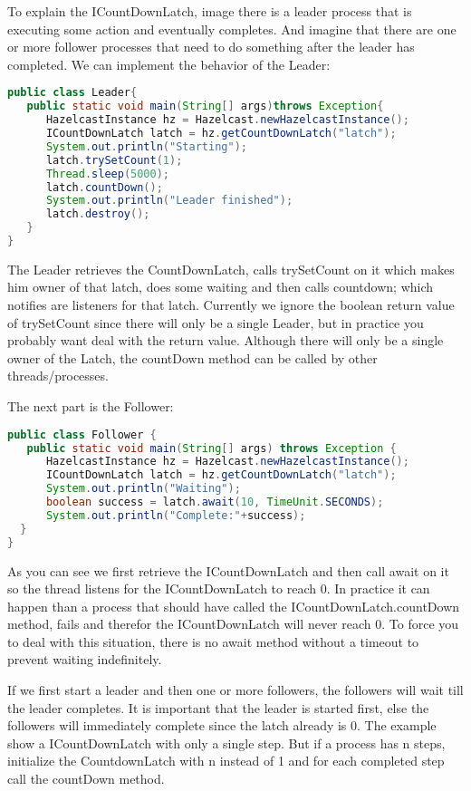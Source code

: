 To explain the ICountDownLatch, image there is a leader process that is executing some action and eventually completes. And imagine that there are one or more follower processes that need to do something after the leader has completed. We can implement the behavior of the Leader:
\begin{lstlisting}[language=java]
public class Leader{
   public static void main(String[] args)throws Exception{
      HazelcastInstance hz = Hazelcast.newHazelcastInstance();
      ICountDownLatch latch = hz.getCountDownLatch("latch");      
      System.out.println("Starting");
      latch.trySetCount(1); 
      Thread.sleep(5000);
      latch.countDown();
      System.out.println("Leader finished");
      latch.destroy();
   }
}
\end{lstlisting}
The Leader retrieves the CountDownLatch, calls trySetCount on it which makes him owner of that latch, does some waiting and then calls countdown; which notifies are listeners for that latch. Currently we ignore the boolean return value of trySetCount since there will only be a single Leader, but in practice you probably want deal with the return value. Although there will only be a single owner of the Latch, the countDown method can be called by other threads/processes.

The next part is the Follower:
\begin{lstlisting}[language=java]
public class Follower {
   public static void main(String[] args) throws Exception {
      HazelcastInstance hz = Hazelcast.newHazelcastInstance();
      ICountDownLatch latch = hz.getCountDownLatch("latch");
      System.out.println("Waiting");
      boolean success = latch.await(10, TimeUnit.SECONDS);
      System.out.println("Complete:"+success);
  }
}
\end{lstlisting}
As you can see we first retrieve the ICountDownLatch and then call await on it so the thread listens for the ICountDownLatch to reach 0. In practice it can happen than a process that should have called the ICountDownLatch.countDown method, fails and therefor the ICountDownLatch will never reach 0. To force you to deal with this situation, there is no await method without a timeout to prevent waiting indefinitely. 

If we first start a leader and then one or more followers, the followers will wait till the leader completes. It is important that the leader is started first, else the followers will immediately complete since the latch already is 0. The example show a ICountDownLatch with only a single step. But if a process has n steps, initialize the CountdownLatch with n instead of 1 and for each completed step call the countDown method.

